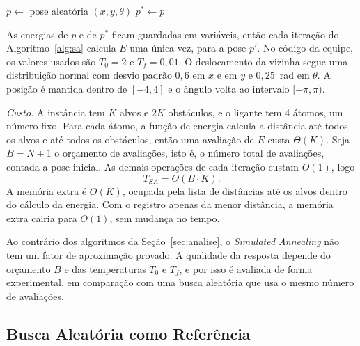 \documentclass[conference]{IEEEtran}
\theoremstyle{definition}
\theoremstyle{plain}
\begin{document}
\begin{algorithm}[htbp]
\caption{\texttt{SIMULATED-ANNEALING}$(E, N, T_0, T_f)$ \cite{kirkpatrick1983optimization}}
\label{alg:sa}
$p \leftarrow$ pose aleatória $(x, y, \theta)$\;
$p^* \leftarrow p$\;
\;
\end{algorithm}

As energias de $p$ e de $p^*$ ficam guardadas em variáveis, então cada iteração do Algoritmo~\ref{alg:sa} calcula $E$ uma única vez, para a pose $p'$. No código da equipe, os valores usados são $T_0 = 2$ e $T_f = 0{,}01$. O deslocamento da vizinha segue uma distribuição normal com desvio padrão $0{,}6$ em $x$ e em $y$ e $0{,}25$~rad em $\theta$. A posição é mantida dentro de $[-4, 4]$ e o ângulo volta ao intervalo $[-\pi, \pi)$.

\textit{Custo.} A instância tem $K$ alvos e $2K$ obstáculos, e o ligante tem 4 átomos, um número fixo. Para cada átomo, a função de energia calcula a distância até todos os alvos e até todos os obstáculos, então uma avaliação de $E$ custa $\Theta(K)$. Seja $B = N + 1$ o orçamento de avaliações, isto é, o número total de avaliações, contada a pose inicial. As demais operações de cada iteração custam $O(1)$, logo
\begin{equation}
T_{SA} = \Theta(B \cdot K).
\end{equation}
A memória extra é $O(K)$, ocupada pela lista de distâncias até os alvos dentro do cálculo da energia. Com o registro apenas da menor distância, a memória extra cairia para $O(1)$, sem mudança no tempo.

Ao contrário dos algoritmos da Seção~\ref{sec:analise}, o \textit{Simulated Annealing} não tem um fator de aproximação provado. A qualidade da resposta depende do orçamento $B$ e das temperaturas $T_0$ e $T_f$, e por isso é avaliada de forma experimental, em comparação com uma busca aleatória que usa o mesmo número de avaliações.

\subsection{Busca Aleatória como Referência}
\label{subsec:rs}
\end{document}
